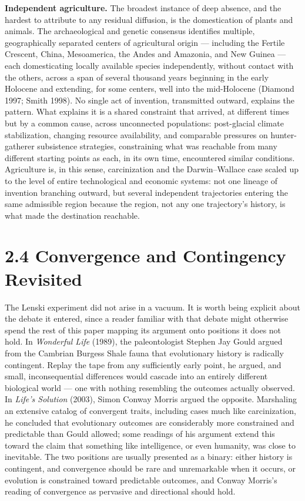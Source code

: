\documentclass[11pt]{article}
\theoremstyle{plain}
\begin{document}
\textbf{Independent agriculture.} The broadest instance of deep absence, and the hardest to attribute to any residual diffusion, is the domestication of plants and animals. The archaeological and genetic consensus identifies multiple, geographically separated centers of agricultural origin --- including the Fertile Crescent, China, Mesoamerica, the Andes and Amazonia, and New Guinea --- each domesticating locally available species independently, without contact with the others, across a span of several thousand years beginning in the early Holocene and extending, for some centers, well into the mid-Holocene (Diamond 1997; Smith 1998). No single act of invention, transmitted outward, explains the pattern. What explains it is a shared constraint that arrived, at different times but by a common cause, across unconnected populations: post-glacial climate stabilization, changing resource availability, and comparable pressures on hunter-gatherer subsistence strategies, constraining what was reachable from many different starting points as each, in its own time, encountered similar conditions. Agriculture is, in this sense, carcinization and the Darwin--Wallace case scaled up to the level of entire technological and economic systems: not one lineage of invention branching outward, but several independent trajectories entering the same admissible region because the region, not any one trajectory's history, is what made the destination reachable.

\section*{2.4 Convergence and Contingency Revisited}

The Lenski experiment did not arise in a vacuum. It is worth being explicit about the debate it entered, since a reader familiar with that debate might otherwise spend the rest of this paper mapping its argument onto positions it does not hold. In \emph{Wonderful Life} (1989), the paleontologist Stephen Jay Gould argued from the Cambrian Burgess Shale fauna that evolutionary history is radically contingent. Replay the tape from any sufficiently early point, he argued, and small, inconsequential differences would cascade into an entirely different biological world --- one with nothing resembling the outcomes actually observed. In \emph{Life's Solution} (2003), Simon Conway Morris argued the opposite. Marshaling an extensive catalog of convergent traits, including cases much like carcinization, he concluded that evolutionary outcomes are considerably more constrained and predictable than Gould allowed; some readings of his argument extend this toward the claim that something like intelligence, or even humanity, was close to inevitable. The two positions are usually presented as a binary: either history is contingent, and convergence should be rare and unremarkable when it occurs, or evolution is constrained toward predictable outcomes, and Conway Morris's reading of convergence as pervasive and directional should hold.
\end{document}
